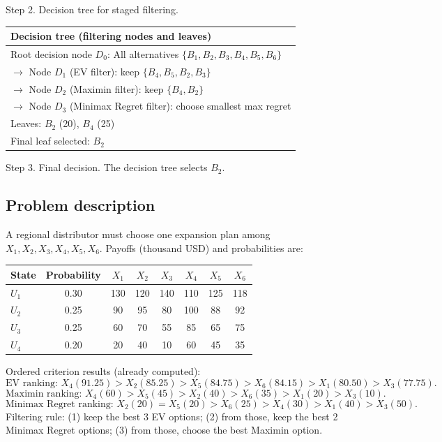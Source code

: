 \begin{ExamProblems}
		Step 2. Decision tree for staged filtering.
		\begin{center}
			\begin{tabular}{l}
				\toprule
				Decision tree (filtering nodes and leaves) \\
				\midrule
				Root decision node $D_0$: All alternatives $\{B_1,B_2,B_3,B_4,B_5,B_6\}$ \\
				$\rightarrow$ Node $D_1$ (EV filter): keep $\{B_4,B_5,B_2,B_3\}$ \\
				$\rightarrow$ Node $D_2$ (Maximin filter): keep $\{B_4,B_2\}$ \\
				$\rightarrow$ Node $D_3$ (Minimax Regret filter): choose smallest max regret \\
				Leaves: $B_2$ (20), $B_4$ (25) \\
				Final leaf selected: $B_2$ \\
				\bottomrule
			\end{tabular}
		\end{center}

		Step 3. Final decision.
		The decision tree selects $B_2$.

		\newpage
		\item
		\subsection*{Problem description}
		A regional distributor must choose one expansion plan among $X_1,X_2,X_3,X_4,X_5,X_6$.
		Payoffs (thousand USD) and probabilities are:
		\begin{center}
			\begin{tabular}{l c c c c c c c}
				\toprule
				State & Probability & $X_1$ & $X_2$ & $X_3$ & $X_4$ & $X_5$ & $X_6$ \\
				\midrule
				$U_1$ & 0.30 & 130 & 120 & 140 & 110 & 125 & 118 \\
				$U_2$ & 0.25 & 90 & 95 & 80 & 100 & 88 & 92 \\
				$U_3$ & 0.25 & 60 & 70 & 55 & 85 & 65 & 75 \\
				$U_4$ & 0.20 & 20 & 40 & 10 & 60 & 45 & 35 \\
				\bottomrule
			\end{tabular}
		\end{center}
		Ordered criterion results (already computed):
		\[
		\text{EV ranking: }X_4(91.25)>X_2(85.25)>X_5(84.75)>X_6(84.15)>X_1(80.50)>X_3(77.75).
		\]
		\[
		\text{Maximin ranking: }X_4(60)>X_5(45)>X_2(40)>X_6(35)>X_1(20)>X_3(10).
		\]
		\[
		\text{Minimax Regret ranking: }X_2(20)=X_5(20)>X_6(25)>X_4(30)>X_1(40)>X_3(50).
		\]
		Filtering rule:
		(1) keep the best 3 EV options;
		(2) from those, keep the best 2 Minimax Regret options;
		(3) from those, choose the best Maximin option.


\end{ExamProblems}
